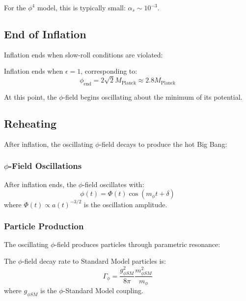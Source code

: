 For the $\phi^4$ model, this is typically small: $\alpha_s \sim 10^{-3}$.

\subsection{End of Inflation}

Inflation ends when slow-roll conditions are violated:

\begin{theorem}
Inflation ends when $\epsilon = 1$, corresponding to:
\begin{equation}
\phi_{\text{end}} = 2\sqrt{2} M_{\text{Planck}} \approx 2.8 M_{\text{Planck}}
\label{eq:phi_inflation_end}
\end{equation}
\end{theorem}

At this point, the $\phi$-field begins oscillating about the minimum of its potential.

\subsection{Reheating}

After inflation, the oscillating $\phi$-field decays to produce the hot Big Bang:

\subsubsection{$\phi$-Field Oscillations}

\begin{theorem}
After inflation ends, the $\phi$-field oscillates with:
\begin{equation}
\phi(t) = \Phi(t) \cos(m_\phi t + \delta)
\label{eq:phi_field_oscillations}
\end{equation}
where $\Phi(t) \propto a(t)^{-3/2}$ is the oscillation amplitude.
\end{theorem}

\subsubsection{Particle Production}

The oscillating $\phi$-field produces particles through parametric resonance:

\begin{theorem}
The $\phi$-field decay rate to Standard Model particles is:
\begin{equation}
\Gamma_\phi = \frac{g_{\phi SM}^2}{8\pi} \frac{m_{\phi SM}^2}{m_\phi}
\label{eq:phi_decay_rate}
\end{equation}
where $g_{\phi SM}$ is the $\phi$-Standard Model coupling.
\end{theorem}


